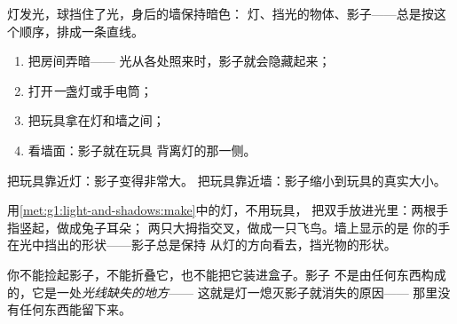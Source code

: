 \begin{omfigure}

{\small 灯发光，球挡住了光，身后的墙保持暗色：
灯、挡光的物体、影子——总是按这个顺序，排成一条直线。}
\end{omfigure}

\begin{method}[做出清晰的影子]\label{met:g1:light-and-shadows:make}
\begin{enumerate}
  \item 把房间弄暗——
        光从各处照来时，影子就会隐藏起来；
  \item 打开\emph{一}盏灯或手电筒；
  \item 把玩具拿在灯和墙之间；
  \item 看墙面：影子就在玩具
        背离灯的那一侧。
\end{enumerate}
把玩具靠近灯：影子变得非常大。
把玩具靠近墙：影子缩小到玩具的真实大小。
\end{method}

\begin{example}\label{ex:g1:light-and-shadows:animals}
用\cref{met:g1:light-and-shadows:make}中的灯，不用玩具，
把双手放进光里：两根手指竖起，做成兔子耳朵；
两只大拇指交叉，做成一只飞鸟。墙上显示的是
你的手在光中挡出的形状——影子总是保持
从灯的方向看去，挡光物的形状。
\end{example}

\begin{remark}[影子不是实物]\label{rem:g1:light-and-shadows:notathing}
你不能捡起影子，不能折叠它，也不能把它装进盒子。影子
不是由任何东西构成的，它是一处\emph{光线缺失的地方}——
这就是灯一熄灭影子就消失的原因——
那里没有任何东西能留下来。
\end{remark}

